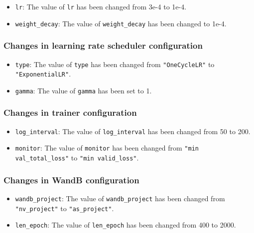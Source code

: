\documentclass[a4paper]{article}
\begin{document}
\begin{itemize}
    \item \texttt{lr}: The value of \texttt{lr} has been changed from 3e-4 to 1e-4.
    \item \texttt{weight\_decay}: The value of \texttt{weight\_decay} has been changed to 1e-4.
\end{itemize}

\subsubsection{Changes in learning rate scheduler configuration}

\begin{itemize}
    \item \texttt{type}: The value of \texttt{type} has been changed from \texttt{"OneCycleLR"} to \texttt{"ExponentialLR"}.
    \item \texttt{gamma}: The value of \texttt{gamma} has been set to 1.
\end{itemize}

\subsubsection{Changes in trainer configuration}

\begin{itemize}
    \item \texttt{log\_interval}: The value of \texttt{log\_interval} has been changed from 50 to 200.
    \item \texttt{monitor}: The value of \texttt{monitor} has been changed from \texttt{"min val\_total\_loss"} to \texttt{"min valid\_loss"}.
\end{itemize}

\subsubsection{Changes in WandB configuration}

\begin{itemize}
    \item \texttt{wandb\_project}: The value of \texttt{wandb\_project} has been changed from \texttt{"nv\_project"} to \texttt{"as\_project"}.
    \item \texttt{len\_epoch}: The value of \texttt{len\_epoch} has been changed from 400 to 2000.
\end{itemize}

\end{document}

